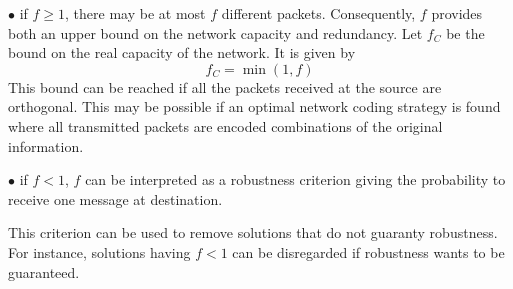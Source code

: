 \documentclass[a4paper]{article}
\begin{document}
{$\bullet$ if $f\geq1$, there may be at most $f$ different packets. Consequently, $f$ provides both an upper bound on the network capacity and redundancy. Let $f_C$ be the bound on the real capacity of the network. It is given by
\[ f_C = \min(1, f)
\]  This bound can be reached if all the packets received at the source are orthogonal. This may be possible if an optimal network coding strategy is found where all transmitted packets are encoded combinations of the original information. 

$\bullet$ if $f<1$, $f$ can be interpreted as a robustness criterion giving the probability to receive one message at destination.      

This criterion can be used to remove solutions that do not guaranty robustness. For instance, solutions having $f<1$ can be disregarded if robustness wants to be guaranteed.

}
\end{document}
